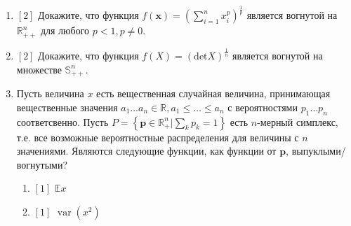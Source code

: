 \documentclass{article}
\DeclareMathOperator{\var}{var}
\begin{document}
\begin{enumerate}
    \item $[2]$ Докажите, что функция $f(\mathbf{x})=\left(\sum\limits_{i=1}^n x_i^p\right)^{\frac{1}{p}}$ является вогнутой на $\mathbb{R}^n_{++}$ для любого $p<1, p\neq 0$.
    
    \item $[2]$ Докажите, что функция $f(X)=(\text{det}X)^{\frac{1}{n}}$ является вогнутой на множестве $\mathbb{S}^n_{++}$.
    
    \item Пусть величина $x$ есть вещественная случайная величина, принимающая вещественные значения $a_1\dots a_n\in \mathbb{R}, a_1\leq\dots\leq a_n $ с вероятностями $p_1\dots p_n$ соответсвенно. Пусть $P=\left\{\textbf{p}\in \mathbb{R}^n_+\Big| \sum_k p_k = 1\right\}$ есть $n$-мерный симплекс, т.е. все возможные вероятностные распределения для величины с $n$ значениями. Являются следующие функции, как функции от $\textbf{p}$, выпуклыми/вогнутыми?
    \begin{enumerate}
        \item $[1]$ $\mathbb{E}x$
        \item $[1]$ $\var(x^2)$
    \end{enumerate}
\end{enumerate}
\end{document}
